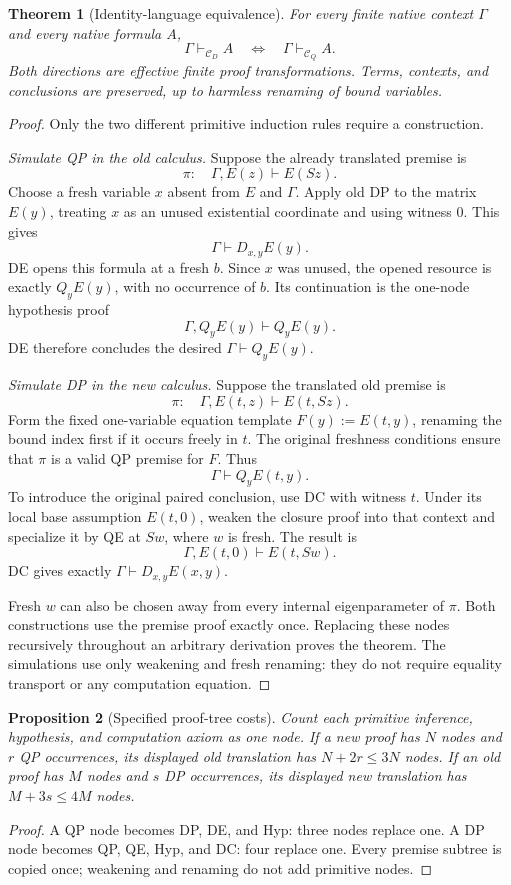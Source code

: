 \documentclass[11pt]{article}
\newtheorem{theorem}{Theorem}[section]
\newtheorem{proposition}[theorem]{Proposition}
\theoremstyle{definition}
\newcommand{\CD}{\mathcal C_D}
\newcommand{\CQ}{\mathcal C_Q}
\begin{document}
\begin{theorem}[Identity-language equivalence]
For every finite native context $\Gamma$ and every native formula $A$,
\[
       \Gamma\vdash_{\CD} A
       \quad\Longleftrightarrow\quad
       \Gamma\vdash_{\CQ} A.
\]
Both directions are effective finite proof transformations. Terms, contexts,
and conclusions are preserved, up to harmless renaming of bound variables.
\end{theorem}
\begin{proof}
Only the two different primitive induction rules require a construction.

\emph{Simulate QP in the old calculus.}
Suppose the already translated premise is
\[
                  \pi:\quad\Gamma,E(z)\vdash E(Sz).
\]
Choose a fresh variable $x$ absent from $E$ and $\Gamma$. Apply old DP to
the matrix $E(y)$, treating $x$ as an unused existential coordinate and using
witness $0$. This gives
\[
                  \Gamma\vdash D_{x,y}E(y).
\]
DE opens this formula at a fresh $b$. Since $x$ was unused, the opened
resource is exactly $Q_yE(y)$, with no occurrence of $b$. Its continuation
is the one-node hypothesis proof
\[
            \Gamma,Q_yE(y)\vdash Q_yE(y).
\]
DE therefore concludes the desired $\Gamma\vdash Q_yE(y)$.

\emph{Simulate DP in the new calculus.}
Suppose the translated old premise is
\[
                  \pi:\quad\Gamma,E(t,z)\vdash E(t,Sz).
\]
Form the fixed one-variable equation template $F(y):=E(t,y)$, renaming the
bound index first if it occurs freely in $t$. The original freshness
conditions ensure that $\pi$ is a valid QP premise for $F$. Thus
\[
                  \Gamma\vdash Q_yE(t,y).
\]
To introduce the original paired conclusion, use DC with witness $t$. Under
its local base assumption $E(t,0)$, weaken the closure proof into that
context and specialize it by QE at $Sw$, where $w$ is fresh. The result is
\[
                \Gamma,E(t,0)\vdash E(t,Sw).
\]
DC gives exactly $\Gamma\vdash D_{x,y}E(x,y)$.

Fresh $w$ can also be chosen away from every internal eigenparameter of
$\pi$. Both constructions use the premise proof exactly once. Replacing
these nodes recursively throughout an arbitrary derivation proves the
theorem. The simulations use only weakening and fresh renaming: they do not
require equality transport or any computation equation.
\end{proof}

\begin{proposition}[Specified proof-tree costs]
Count each primitive inference, hypothesis, and computation axiom as one
node. If a new proof has $N$ nodes and $r$ QP occurrences, its displayed old
translation has $N+2r\leq3N$ nodes. If an old proof has $M$ nodes and $s$ DP
occurrences, its displayed new translation has $M+3s\leq4M$ nodes.
\end{proposition}
\begin{proof}
A QP node becomes DP, DE, and Hyp: three nodes replace one. A DP node becomes
QP, QE, Hyp, and DC: four replace one. Every premise subtree is copied once;
weakening and renaming do not add primitive nodes.
\end{proof}
\end{document}
